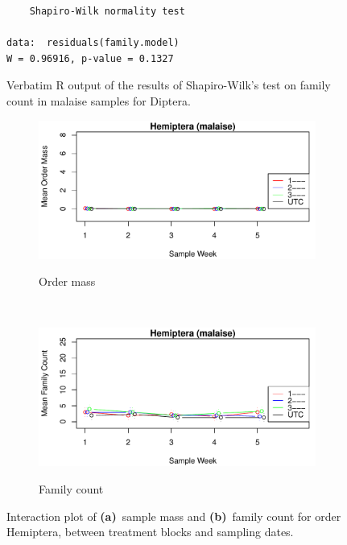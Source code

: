 \documentclass[10pt,letterpaper,twocolumn]{article}
\begin{document}
\begin{figure}[h]
	\lstset{numbers=left}
	\lstset{xleftmargin=5mm,framexleftmargin=5mm}
	\begin{lstlisting}
	Shapiro-Wilk normality test

data:  residuals(family.model)
W = 0.96916, p-value = 0.1327
	\end{lstlisting}
	\caption{Verbatim R output of the results of Shapiro-Wilk's test on family count in malaise samples for Diptera.}
	\label{fig:malaise_diptera_family_shapiro}
	\smallskip
	\nointerlineskip
	\hrulefill
\end{figure}

\begin{figure}[h]
	\centering
	\begin{subfigure}[b]{0.45\textwidth}
		\caption{Order mass}
		\includegraphics[width=\textwidth]{plots/blocks/interaction/mass/mass_malaise_Hemiptera_interplot.pdf}
		\label{fig:malaise_hemiptera_mass_interplot}
	\end{subfigure}
	~
	\begin{subfigure}[b]{0.45\textwidth}
		\caption{Family count}
		\includegraphics[width=\textwidth]{plots/blocks/interaction/family/family_malaise_Hemiptera_interplot.pdf}
		\label{fig:malaise_hemiptera_family_interplot}
	\end{subfigure}
	\caption{Interaction plot of \textbf{(a)}~sample mass and \textbf{(b)}~family count for order Hemiptera, between treatment blocks and sampling dates.}
	\label{fig:malaise_hemiptera_interplot}
	\smallskip
	\nointerlineskip
	\hrulefill
\end{figure}
\end{document}
